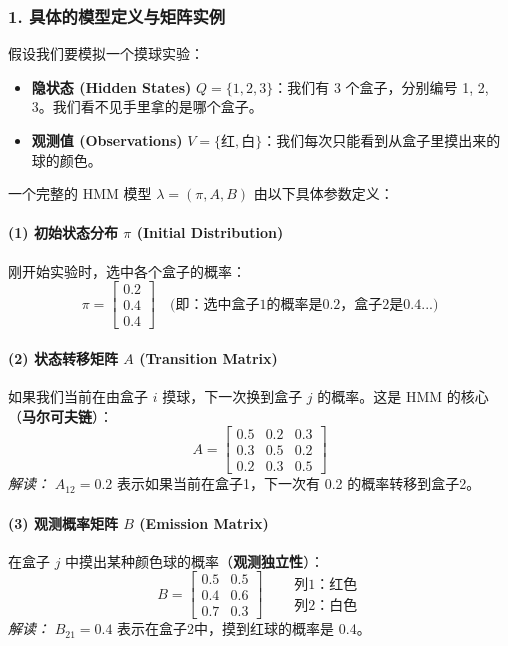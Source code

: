 \documentclass[a4paper, 11pt]{ctexart}
\begin{document}
\subsubsection{1. 具体的模型定义与矩阵实例}

假设我们要模拟一个摸球实验：
\begin{itemize}
    \item \textbf{隐状态 (Hidden States)} $Q = \{1, 2, 3\}$：我们有 3 个盒子，分别编号 1, 2, 3。我们看不见手里拿的是哪个盒子。
    \item \textbf{观测值 (Observations)} $V = \{红, 白\}$：我们每次只能看到从盒子里摸出来的球的颜色。
\end{itemize}

一个完整的 HMM 模型 $\lambda = (\pi, A, B)$ 由以下具体参数定义：

\paragraph{(1) 初始状态分布 $\pi$ (Initial Distribution)}
刚开始实验时，选中各个盒子的概率：
\begin{equation}
    \pi = \begin{bmatrix} 0.2 \\ 0.4 \\ 0.4 \end{bmatrix} 
    \quad \text{(即：选中盒子1的概率是0.2，盒子2是0.4...)}
\end{equation}

\paragraph{(2) 状态转移矩阵 $A$ (Transition Matrix)}
如果我们当前在由盒子 $i$ 摸球，下一次换到盒子 $j$ 的概率。这是 HMM 的核心（\textbf{马尔可夫链}）：
\begin{equation}
    A = \begin{bmatrix}
    0.5 & 0.2 & 0.3 \\
    0.3 & 0.5 & 0.2 \\
    0.2 & 0.3 & 0.5 
    \end{bmatrix}
\end{equation}
\textit{解读：} $A_{12} = 0.2$ 表示如果当前在盒子1，下一次有 0.2 的概率转移到盒子2。

\paragraph{(3) 观测概率矩阵 $B$ (Emission Matrix)}
在盒子 $j$ 中摸出某种颜色球的概率（\textbf{观测独立性}）：
\begin{equation}
    B = \begin{bmatrix}
    0.5 & 0.5 \\
    0.4 & 0.6 \\
    0.7 & 0.3 
    \end{bmatrix} \quad 
    \begin{aligned}
    &\text{列1：红色} \\
    &\text{列2：白色}
    \end{aligned}
\end{equation}
\textit{解读：} $B_{21} = 0.4$ 表示在盒子2中，摸到红球的概率是 0.4。
\end{document}
